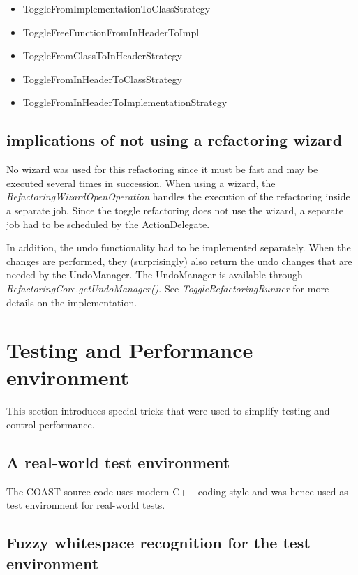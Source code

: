 \begin{itemize}
\item ToggleFromImplementationToClassStrategy
\item ToggleFreeFunctionFromInHeaderToImpl
\item ToggleFromClassToInHeaderStrategy
\item ToggleFromInHeaderToClassStrategy
\item ToggleFromInHeaderToImplementationStrategy
\end{itemize}

\subsection{implications of not using a refactoring wizard}
No wizard was used for this refactoring since it must be fast and may be 
executed several times in succession. When using a wizard, the 
\textit{RefactoringWizardOpenOperation} handles the execution of the refactoring 
inside a separate job. Since the toggle refactoring does not use the wizard, a 
separate job had to be scheduled by the ActionDelegate.

In addition, the undo functionality had to be implemented separately. When the 
changes are performed, they (surprisingly) also return the undo changes that are 
needed by the UndoManager. The UndoManager is available through 
\textit{RefactoringCore.getUndoManager()}. See \textit{ToggleRefactoringRunner} 
for more details on the implementation.

\section{Testing and Performance environment}

This section introduces special tricks that were used to simplify testing and
control performance.

\subsection{A real-world test environment}
The COAST source code uses modern C++ coding style and was hence used as test 
environment for real-world tests.

\subsection[Fuzzy whitespace recognition for the tests]{Fuzzy whitespace 
recognition for the test environment}


